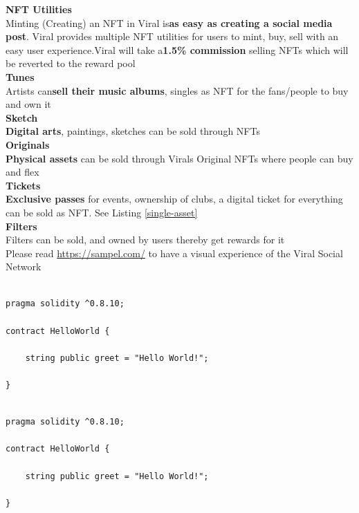 \documentclass[10pt]{article}
\begin{document}
\textbf{NFT Utilities}\\

Minting (Creating) an NFT in Viral is\textbf{as easy as creating a social media post}. Viral provides multiple NFT utilities for users to mint, buy, sell with an easy user experience.Viral will take a\textbf{1.5\% commission} selling NFTs which will be reverted to the reward pool\\


\textbf{Tunes}\\
Artists can\textbf{sell their music albums}, singles as NFT for the fans/people to buy and own it\\


\textbf{Sketch}\\
\textbf{Digital arts}, paintings, sketches can be sold through NFTs\\

\textbf{Originals}\\
\textbf{Physical assets} can be sold through Viral\textsc{}s Original NFTs where people can buy and flex\\

\textbf{Tickets}\\
\textbf{Exclusive passes} for events, ownership of clubs, a digital ticket for everything can be sold as NFT. See Listing \ref{single-asset}\\

\textbf{Filters}\\
Filters can be sold, and owned by user\textsc{}s thereby get rewards for it\\

Please read \hyperlink{App Brouchure}{https://sampel.com/} to have a visual experience of the Viral Social Network

\newpage

\begin{lstlisting}[language=Solidity, caption={NFT Snippet for Enable/Disable Open Sale}, numbers=none]

pragma solidity ^0.8.10;

contract HelloWorld {

    string public greet = "Hello World!";
    
}
\end{lstlisting}

\begin{lstlisting}[language=Solidity, caption={NFT Snippet To Sell Multiple Copies}, numbers=none]

pragma solidity ^0.8.10;

contract HelloWorld {

    string public greet = "Hello World!";
    
}
\end{lstlisting}
\end{document}
